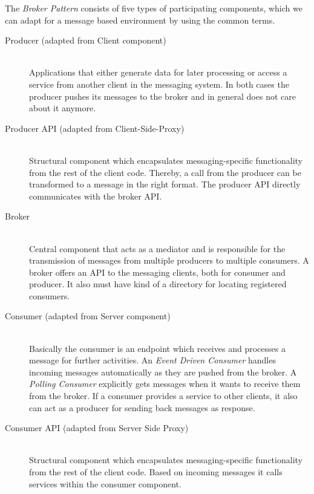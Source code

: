 The \textit{Broker Pattern} consists of five types of participating components,
which we can adapt for a message based environment by using the common terms.

\begin{description}
    \item[Producer (adapted from Client component)] \hfill \\
        {Applications that either generate data for later processing or
        access a service from another client in the messaging system. In both
        cases the producer pushes its messages to the broker and in general does
        not care about it anymore.}
    \item[Producer API (adapted from Client-Side-Proxy)] \hfill \\
        {Structural component which encapsulates messaging-specific
        functionality from the rest of the client code. Thereby, a call from the producer
        can be transformed to a message in the right format. The producer API
        directly communicates with the broker API.}
    \item[Broker] \hfill \\
        {Central component that acts as a mediator and is responsible for the
        transmission of messages from multiple producers to multiple consumers.
        A broker offers an API to the messaging clients, both for consumer and
        producer. It also must have kind of a directory for locating registered
        consumers.} 
    \item[Consumer (adapted from Server component)] \hfill \\
        {Basically the consumer is an endpoint which receives and processes a
            message for further activities. An \textit{Event Driven Consumer}
            handles incoming messages automatically as they are pushed from the
            broker. A \textit{Polling Consumer} explicitly gets messages when it
            wants to receive them from the broker. If a consumer provides a
            service to other clients, it also can act as a producer for sending
            back messages as response.}
    \item[Consumer API (adapted from Server Side Proxy)] \hfill \\
        {Structural component which encapsulates messaging-specific
        functionality from the rest of the client code. Based on incoming
        messages it calls services within the consumer component.}
\end{description}

